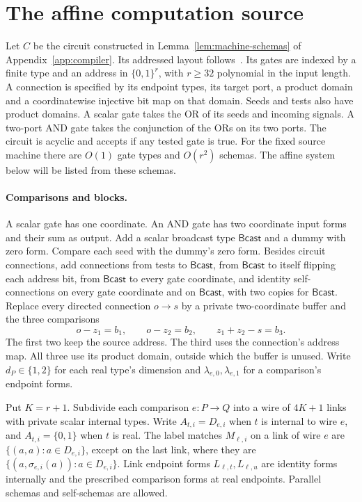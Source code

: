 \documentclass[11pt]{article}
\theoremstyle{definition}
\theoremstyle{remark}
\numberwithin{equation}{section}
\begin{document}
\section{The affine computation source}
\label{hs:section}

Let $C$ be the circuit constructed in Lemma~\ref{lem:machine-schemas}
of Appendix~\ref{app:compiler}. Its addressed layout follows~\cite{OpenAI2026}.
Its gates are indexed by a finite type
and an address in $\{0,1\}^r$, with $r\ge32$ polynomial in the input
length. A connection is specified by its endpoint types, its target
port, a product domain and a coordinatewise injective bit map on that
domain. Seeds and tests also have product domains. A scalar gate takes
the OR of its seeds and incoming signals. A two-port AND gate takes
the conjunction of the ORs on its two ports. The circuit is acyclic
and accepts if any tested gate is true. For the fixed source machine
there are $O(1)$ gate types and $O(r^2)$ schemas. The affine system below will be listed from these schemas.

\paragraph{Comparisons and blocks.}
A scalar gate has one coordinate. An AND gate has two coordinate input
forms and their sum as output.  Add a scalar broadcast type \(\mathsf{Bcast}\) and
a dummy with zero form.  Compare each seed with the dummy's zero form.
Besides circuit connections, add connections from tests to \(\mathsf{Bcast}\), from
\(\mathsf{Bcast}\) to itself flipping each address bit, from \(\mathsf{Bcast}\) to every gate
coordinate, and identity self-connections on every gate coordinate and
on \(\mathsf{Bcast}\), with two copies for \(\mathsf{Bcast}\).
Replace every directed connection \(o\to s\) by a private two-coordinate
buffer and the three comparisons
\begin{equation}
 o-z_1=b_1,\qquad o-z_2=b_2,\qquad z_1+z_2-s=b_3.
 \label{hs:buffer}
\end{equation}
The first two keep the source address. The third uses the connection's
address map.  All three use its product domain, outside which the
buffer is unused.
Write \(d_P\in\{1,2\}\) for each real type's dimension and
\(\lambda_{e,0},\lambda_{e,1}\) for a comparison's endpoint forms.

Put \(K=r+1\).  Subdivide each comparison \(e:P\to Q\) into a wire
of \(4K+1\) links with private scalar internal types.
Write \(A_{t,i}=D_{e,i}\) when \(t\) is internal to wire \(e\), and
\(A_{t,i}=\{0,1\}\) when \(t\) is real.
The label matches \(M_{\ell,i}\) on a link of wire \(e\) are
\(\{(a,a):a\in D_{e,i}\}\), except on the last link, where they are
\(\{(a,\sigma_{e,i}(a)):a\in D_{e,i}\}\).
Link endpoint forms \(L_{\ell,t},L_{\ell,u}\) are
identity forms internally and the prescribed comparison forms at real
endpoints.  Parallel schemas and self-schemas are allowed.
\end{document}
